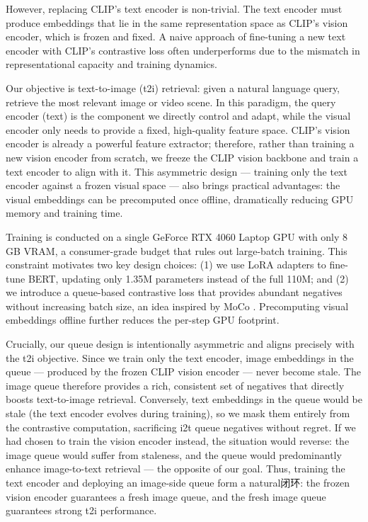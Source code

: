 \documentclass[10pt,leqno]{amsart}
\begin{document}
However, replacing CLIP's text encoder is non-trivial. The text encoder must produce embeddings that lie in the same representation space as CLIP's vision encoder, which is frozen and fixed. A naive approach of fine-tuning a new text encoder with CLIP's contrastive loss often underperforms due to the mismatch in representational capacity and training dynamics.

Our objective is text-to-image (t2i) retrieval: given a natural language query, retrieve the most relevant image or video scene. In this paradigm, the query encoder (text) is the component we directly control and adapt, while the visual encoder only needs to provide a fixed, high-quality feature space. CLIP's vision encoder is already a powerful feature extractor; therefore, rather than training a new vision encoder from scratch, we freeze the CLIP vision backbone and train a text encoder to align with it. This asymmetric design --- training only the text encoder against a frozen visual space --- also brings practical advantages: the visual embeddings can be precomputed once offline, dramatically reducing GPU memory and training time.

Training is conducted on a single GeForce RTX 4060 Laptop GPU with only 8 GB VRAM, a consumer-grade budget that rules out large-batch training. This constraint motivates two key design choices: (1) we use LoRA \citep{hu2022lora} adapters to fine-tune BERT, updating only 1.35M parameters instead of the full 110M; and (2) we introduce a queue-based contrastive loss that provides abundant negatives without increasing batch size, an idea inspired by MoCo \citep{he2020moco}. Precomputing visual embeddings offline further reduces the per-step GPU footprint.

Crucially, our queue design is intentionally asymmetric and aligns precisely with the t2i objective. Since we train only the text encoder, image embeddings in the queue --- produced by the frozen CLIP vision encoder --- never become stale. The image queue therefore provides a rich, consistent set of negatives that directly boosts text-to-image retrieval. Conversely, text embeddings in the queue would be stale (the text encoder evolves during training), so we mask them entirely from the contrastive computation, sacrificing i2t queue negatives without regret. If we had chosen to train the vision encoder instead, the situation would reverse: the image queue would suffer from staleness, and the queue would predominantly enhance image-to-text retrieval --- the opposite of our goal. Thus, training the text encoder and deploying an image-side queue form a natural闭环: the frozen vision encoder guarantees a fresh image queue, and the fresh image queue guarantees strong t2i performance.
\end{document}

